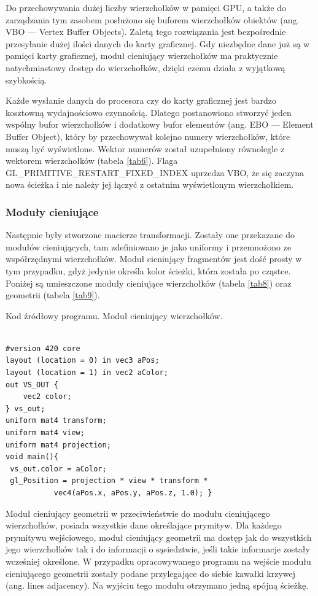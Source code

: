 Do przechowywania dużej liczby wierzchołków w pamięci GPU, a także do zarządzania tym zasobem posłużono się buforem wierzchołków obiektów (ang. VBO --- Vertex Buffer Objects). Zaletą tego rozwiązania jest bezpośrednie przesyłanie dużej ilości danych do karty graficznej. Gdy niezbędne dane już są w pamięci karty graficznej, moduł cieniujący wierzchołków ma praktycznie natychmiastowy dostęp do wierzchołków, dzięki czemu działa z wyjątkową szybkością.

Każde wysłanie danych do procesora czy do karty graficznej jest bardzo kosztowną wydajnościowo czynnością. Dlatego postanowiono stworzyć jeden wspólny bufor wierzchołków i dodatkowy bufor elementów (ang. EBO --- Element Buffer Object), który by przechowywał kolejno numery wierzchołków, które muszą być wyświetlone. Wektor numerów został uzupełniony równolegle z wektorem wierzchołków (tabela \ref{tab6}). Flaga GL\_PRIMITIVE\_RESTART\_FIXED\_INDEX uprzedza VBO, że się zaczyna nowa ścieżka i nie należy jej łączyć z ostatnim wyświetlonym wierzchołkiem.

\subsubsection{Moduły cieniujące}
Następnie były stworzone macierze transformacji. Zostały one przekazane do modułów cieniujących, tam zdefiniowano je jako uniformy i przemnożono ze współrzędnymi wierzchołków. Moduł cieniujący fragmentów jest dość prosty w tym przypadku, gdyż jedynie określa kolor ścieżki, która została po cząstce. Poniżej są umieszczone moduły cieniujące wierzchołków (tabela \ref{tab8}) oraz geometrii (tabela \ref{tab9}).
\begin{table}[H]
\caption{Kod źródłowy programu. Moduł cieniujący wierzchołków.}
\label{tab8}
\begin{lstlisting}[frame=single]  % Start your code-block

#version 420 core
layout (location = 0) in vec3 aPos;
layout (location = 1) in vec2 aColor;
out VS_OUT {
    vec2 color;
} vs_out;
uniform mat4 transform;
uniform mat4 view;
uniform mat4 projection;
void main(){
 vs_out.color = aColor;
 gl_Position = projection * view * transform * 
           vec4(aPos.x, aPos.y, aPos.z, 1.0); }
\end{lstlisting}
\end{table}

Moduł cieniujący geometrii w przeciwieństwie do modułu cieniującego wierzchołków, posiada wszystkie dane określające prymityw. Dla każdego prymitywu wejściowego, moduł cieniujący geometrii ma dostęp jak do wszystkich jego wierzchołków tak i do informacji o sąsiedztwie, jeśli takie informacje zostały wcześniej określone. W przypadku opracowywanego programu na wejście modułu cieniującego geometrii zostały podane przylegające do siebie kawałki krzywej (ang. lines adjacency). Na wyjściu tego modułu otrzymano jedną spójną ścieżkę.


